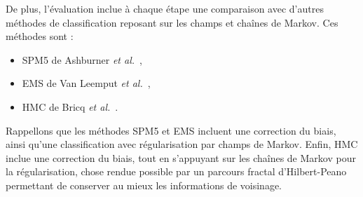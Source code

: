 De plus, l'évaluation inclue à chaque étape une comparaison avec d'autres méthodes de classification reposant sur les champs et chaînes de Markov.
Ces méthodes sont : 
\begin{itemize}
        \item SPM5 de Ashburner \emph{et al.}~\cite{Ashburner:NeuroImage:2005},
        \item EMS de Van Leemput \emph{et al.}~\cite{VanLeemput2:TMI:1999},
        \item HMC de Bricq \emph{et al.}~\cite{Bricq:MIA:2008}.
\end{itemize}
Rappellons que les méthodes SPM5 et EMS incluent une correction du biais, ainsi qu'une classification avec régularisation par champs de Markov.
Enfin, HMC inclue une correction du biais, tout en s'appuyant sur les chaînes de Markov pour la régularisation, chose rendue possible par un parcours fractal d'Hilbert-Peano permettant de conserver au mieux les informations de voisinage.

% 
% 
% 
% 
% 
% 
% 
% 
% 
% 


